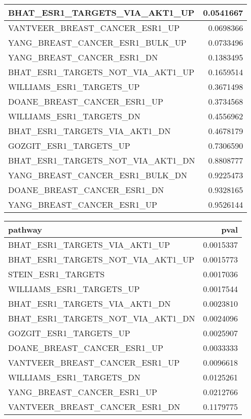 \documentclass[]{article}
\begin{document}
\begin{table}[H]
\begin{table}
\begin{tabular}{l|r}
\hline
BHAT\_ESR1\_TARGETS\_VIA\_AKT1\_UP & 0.0541667\\
\hline
VANTVEER\_BREAST\_CANCER\_ESR1\_UP & 0.0698366\\
\hline
YANG\_BREAST\_CANCER\_ESR1\_BULK\_UP & 0.0733496\\
\hline
YANG\_BREAST\_CANCER\_ESR1\_DN & 0.1383495\\
\hline
BHAT\_ESR1\_TARGETS\_NOT\_VIA\_AKT1\_UP & 0.1659514\\
\hline
WILLIAMS\_ESR1\_TARGETS\_UP & 0.3671498\\
\hline
DOANE\_BREAST\_CANCER\_ESR1\_UP & 0.3734568\\
\hline
WILLIAMS\_ESR1\_TARGETS\_DN & 0.4556962\\
\hline
BHAT\_ESR1\_TARGETS\_VIA\_AKT1\_DN & 0.4678179\\
\hline
GOZGIT\_ESR1\_TARGETS\_UP & 0.7306590\\
\hline
BHAT\_ESR1\_TARGETS\_NOT\_VIA\_AKT1\_DN & 0.8808777\\
\hline
YANG\_BREAST\_CANCER\_ESR1\_BULK\_DN & 0.9225473\\
\hline
DOANE\_BREAST\_CANCER\_ESR1\_DN & 0.9328165\\
\hline
YANG\_BREAST\_CANCER\_ESR1\_UP & 0.9526144\\
\hline
\end{tabular}
\centering
\begin{tabular}{l|r}
\hline
pathway & pval\\
\hline
BHAT\_ESR1\_TARGETS\_VIA\_AKT1\_UP & 0.0015337\\
\hline
BHAT\_ESR1\_TARGETS\_NOT\_VIA\_AKT1\_UP & 0.0015773\\
\hline
STEIN\_ESR1\_TARGETS & 0.0017036\\
\hline
WILLIAMS\_ESR1\_TARGETS\_UP & 0.0017544\\
\hline
BHAT\_ESR1\_TARGETS\_VIA\_AKT1\_DN & 0.0023810\\
\hline
BHAT\_ESR1\_TARGETS\_NOT\_VIA\_AKT1\_DN & 0.0024096\\
\hline
GOZGIT\_ESR1\_TARGETS\_UP & 0.0025907\\
\hline
DOANE\_BREAST\_CANCER\_ESR1\_UP & 0.0033333\\
\hline
VANTVEER\_BREAST\_CANCER\_ESR1\_UP & 0.0096618\\
\hline
WILLIAMS\_ESR1\_TARGETS\_DN & 0.0125261\\
\hline
YANG\_BREAST\_CANCER\_ESR1\_UP & 0.0212766\\
\hline
VANTVEER\_BREAST\_CANCER\_ESR1\_DN & 0.1179775\\

\end{tabular}
\end{table}
\end{table}
\end{document}
